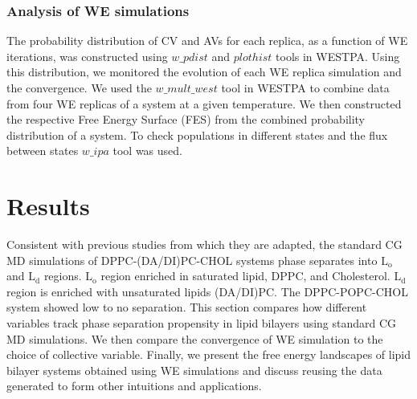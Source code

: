 \documentclass{biophys-new}
\begin{document}
\subsubsection*{Analysis of WE simulations}
The probability distribution of CV and AVs for each replica, as a function of WE iterations, was constructed using $w\_pdist$ and $plothist$ tools in WESTPA.
Using this distribution, we monitored the evolution of each WE replica simulation and the convergence.
We used the $w\_mult\_west$ tool in WESTPA to combine data from four WE replicas of a system at a given temperature.
We then constructed the respective Free Energy Surface (FES) from the combined probability distribution of a system.
To check populations in different states and the flux between states  $w\_ipa$ tool was used.

\section*{Results}

Consistent with previous studies from which they are adapted, the standard CG MD simulations of DPPC-(DA/DI)PC-CHOL systems phase separates into $\text{L}_{\text{o}}$ and $\text{L}_{\text{d}}$ regions.
$\text{L}_{\text{o}}$ region enriched in saturated lipid, DPPC, and Cholesterol. 
$\text{L}_{\text{d}}$ region is enriched with unsaturated lipids (DA/DI)PC.
The DPPC-POPC-CHOL system showed low to no separation.
This section compares how different variables track phase separation propensity in lipid bilayers using standard CG MD simulations.
We then compare the convergence of WE simulation to the choice of collective variable.
Finally, we present the free energy landscapes of lipid bilayer systems obtained using WE simulations and discuss reusing the data generated to form other intuitions and applications.

\end{document}
